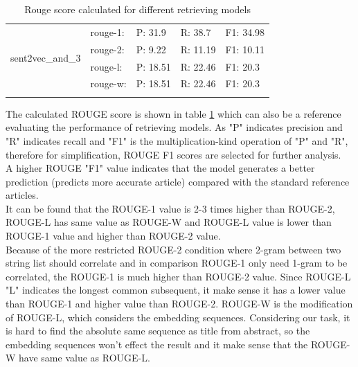 \begin{table}[htbp]
\begin{tabular}{crrrr}
		\midrule
		\multirow{4}[2]{*}{sent2vec\_and\_3} & \multicolumn{1}{l}{rouge-1:} & \multicolumn{1}{l}{P: 31.9} & \multicolumn{1}{l}{R: 38.7} & \multicolumn{1}{l}{F1: 34.98} \\
		& \multicolumn{1}{l}{rouge-2:} & \multicolumn{1}{l}{P: 9.22} & \multicolumn{1}{l}{R: 11.19} & \multicolumn{1}{l}{F1: 10.11} \\
		& \multicolumn{1}{l}{rouge-l:} & \multicolumn{1}{l}{P: 18.51} & \multicolumn{1}{l}{R: 22.46} & \multicolumn{1}{l}{F1: 20.3} \\
		& \multicolumn{1}{l}{rouge-w:} & \multicolumn{1}{l}{P: 18.51} & \multicolumn{1}{l}{R: 22.46} & \multicolumn{1}{l}{F1: 20.3} \\
		\midrule
		&       &       &       &  \\
	\end{tabular}%
	\caption{Rouge score calculated for different retrieving models}
	\label{tab: rouge_score}%
\end{table}%

The calculated ROUGE score is shown in table \ref{tab: rouge_score} which can also be a reference evaluating the performance of retrieving models.	As "P" indicates precision and "R" indicates recall and "F1" is the multiplication-kind operation of "P" and "R", therefore for simplification, ROUGE F1 scores are selected for further analysis.\\

A higher ROUGE "F1" value indicates that the model generates a better prediction (predicts more accurate article) compared with the standard reference articles. \\

It can be found that the ROUGE-1 value is 2-3 times higher than ROUGE-2, ROUGE-L has same value as ROUGE-W and ROUGE-L value is lower than ROUGE-1 value and higher than ROUGE-2 value. \\

Because of the more restricted ROUGE-2 condition where 2-gram between two string list should correlate and in comparison ROUGE-1 only need 1-gram to be correlated, the ROUGE-1 is much higher than ROUGE-2 value.					
Since ROUGE-L "L" indicates the longest common subsequent, it make sense it has a lower value than ROUGE-1 and higher value than ROUGE-2.					
ROUGE-W is the modification of ROUGE-L, which considers the embedding sequences. Considering our task, it is hard to find the absolute same sequence as title from abstract, so the embedding sequences won't effect the result and it make sense that the ROUGE-W have same value as ROUGE-L.

